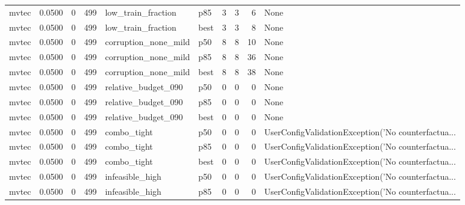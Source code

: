 \begin{tabular}{lrrrllrrrl}
   mvtec &    0.0500 &    0 &    499 &   low\_train\_fraction &    p85 &               3 &          3 &       6 &                                               None \\
   mvtec &    0.0500 &    0 &    499 &   low\_train\_fraction &   best &               3 &          3 &       8 &                                               None \\
   mvtec &    0.0500 &    0 &    499 & corruption\_none\_mild &    p50 &               8 &          8 &      10 &                                               None \\
   mvtec &    0.0500 &    0 &    499 & corruption\_none\_mild &    p85 &               8 &          8 &      36 &                                               None \\
   mvtec &    0.0500 &    0 &    499 & corruption\_none\_mild &   best &               8 &          8 &      38 &                                               None \\
   mvtec &    0.0500 &    0 &    499 &  relative\_budget\_090 &    p50 &               0 &          0 &       0 &                                               None \\
   mvtec &    0.0500 &    0 &    499 &  relative\_budget\_090 &    p85 &               0 &          0 &       0 &                                               None \\
   mvtec &    0.0500 &    0 &    499 &  relative\_budget\_090 &   best &               0 &          0 &       0 &                                               None \\
   mvtec &    0.0500 &    0 &    499 &          combo\_tight &    p50 &               0 &          0 &       0 & UserConfigValidationException('No counterfactua... \\
   mvtec &    0.0500 &    0 &    499 &          combo\_tight &    p85 &               0 &          0 &       0 & UserConfigValidationException('No counterfactua... \\
   mvtec &    0.0500 &    0 &    499 &          combo\_tight &   best &               0 &          0 &       0 & UserConfigValidationException('No counterfactua... \\
   mvtec &    0.0500 &    0 &    499 &      infeasible\_high &    p50 &               0 &          0 &       0 & UserConfigValidationException('No counterfactua... \\
   mvtec &    0.0500 &    0 &    499 &      infeasible\_high &    p85 &               0 &          0 &       0 & UserConfigValidationException('No counterfactua... \\

\end{tabular}
